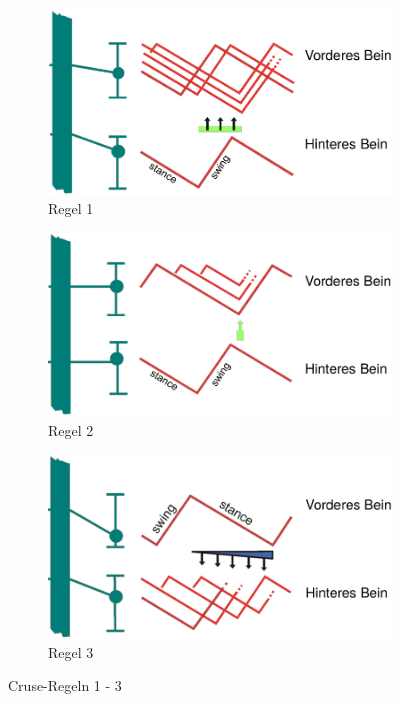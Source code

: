 \begin{figure}[h!]
	\centering
	\begin{subfigure}{.3\textwidth}
		\includegraphics[width=\textwidth]{figures/ch05_CR1.png}
		\caption{Regel 1}
		\label{CR1}
	\end{subfigure}
	\begin{subfigure}{.3\textwidth}
		\includegraphics[width=\textwidth]{figures/ch05_CR2.png}
		\caption{Regel 2}
		\label{CR2}
	\end{subfigure}
	\begin{subfigure}{.3\textwidth}
		\includegraphics[width=\textwidth]{figures/ch05_CR3.png}
		\caption{Regel 3}
		\label{CR3}
	\end{subfigure}
	\caption{Cruse-Regeln 1 - 3}
\end{figure}
